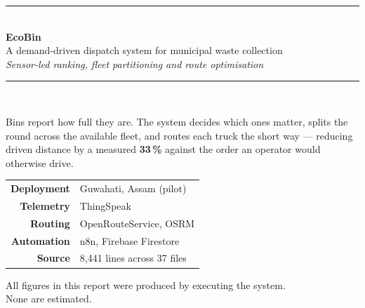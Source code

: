 \documentclass[11pt,a4paper]{article}
\begin{document}
\begin{titlepage}
\centering
\vspace*{2.2cm}

{\color{accent}\rule{\textwidth}{1.4pt}}\\[0.7cm]

{\fontsize{46}{50}\selectfont\bfseries EcoBin}\\[0.5cm]

{\Large A demand-driven dispatch system for municipal waste collection}\\[0.35cm]

{\large\itshape Sensor-led ranking, fleet partitioning and route optimisation}\\[0.6cm]

{\color{accent}\rule{\textwidth}{1.4pt}}\\[1.6cm]

\begin{minipage}{0.82\textwidth}
\centering\large
Bins report how full they are. The system decides which ones matter,
splits the round across the available fleet, and routes each truck
the short way --- reducing driven distance by a measured
\textbf{33\,\%} against the order an operator would otherwise drive.
\end{minipage}

\vfill

\begin{tabular}{rl}
\textbf{Deployment} & Guwahati, Assam (pilot) \\[2pt]
\textbf{Telemetry}  & ThingSpeak \\[2pt]
\textbf{Routing}    & OpenRouteService, OSRM \\[2pt]
\textbf{Automation} & n8n, Firebase Firestore \\[2pt]
\textbf{Source}     & 8{,}441 lines across 37 files \\
\end{tabular}

\vspace{1.4cm}
{\small All figures in this report were produced by executing the system.\\
None are estimated.}

\vspace{1.2cm}
\end{titlepage}

\tableofcontents
\newpage
\end{document}
